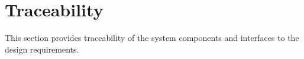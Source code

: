 
\chapter{Traceability}
\label{loc:Traceability}

This section provides traceability of the system components and interfaces to the design requirements.
